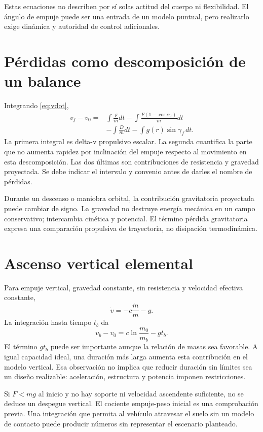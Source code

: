 Estas ecuaciones no describen por sí solas actitud del cuerpo ni flexibilidad. El ángulo de empuje puede ser una entrada de un modelo puntual, pero realizarlo exige dinámica y autoridad de control adicionales.
\section{Pérdidas como descomposición de un balance}
Integrando \eqref{eq:vdot},
\begin{align}
 v_f-v_0={}&\int\frac{F}{m}dt
 -\int\frac{F(1-\cos\alpha_T)}{m}dt\\
 &-\int\frac{D}{m}dt-\int g(r)\sin\gamma_f\,dt.
\end{align}
La primera integral es delta-v propulsivo escalar. La segunda cuantifica la parte que no aumenta rapidez por inclinación del empuje respecto al movimiento en esta descomposición. Las dos últimas son contribuciones de resistencia y gravedad proyectada. Se debe indicar el intervalo y convenio antes de darles el nombre de pérdidas.

Durante un descenso o maniobra orbital, la contribución gravitatoria proyectada puede cambiar de signo. La gravedad no destruye energía mecánica en un campo conservativo; intercambia cinética y potencial. El término pérdida gravitatoria expresa una comparación propulsiva de trayectoria, no disipación termodinámica.
\section{Ascenso vertical elemental}
Para empuje vertical, gravedad constante, sin resistencia y velocidad efectiva constante,
\[
 \dot v=-c\frac{\dot m}{m}-g.
\]
La integración hasta tiempo $t_b$ da
\begin{equation}\label{eq:vertical}
 v_b-v_0=c\ln\frac{m_0}{m_b}-gt_b.
\end{equation}
El término $gt_b$ puede ser importante aunque la relación de masas sea favorable. A igual capacidad ideal, una duración más larga aumenta esta contribución en el modelo vertical. Esa observación no implica que reducir duración sin límites sea un diseño realizable: aceleración, estructura y potencia imponen restricciones.

Si $F<mg$ al inicio y no hay soporte ni velocidad ascendente suficiente, no se deduce un despegue vertical. El cociente empuje-peso inicial es una comprobación previa. Una integración que permita al vehículo atravesar el suelo sin un modelo de contacto puede producir números sin representar el escenario planteado.
